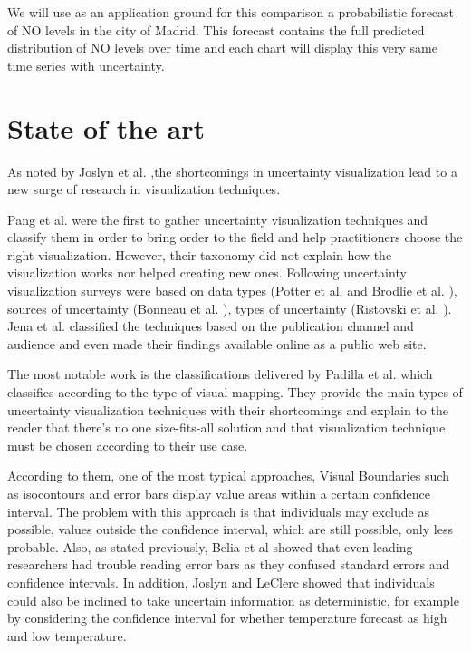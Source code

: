 \documentclass[a4paper,3p,sort&compress]{elsarticle}
\begin{document}
We will use as an application ground for this comparison a probabilistic forecast of NO levels 
in the city of Madrid. This forecast contains the full predicted distribution of NO levels over time
and each chart will display this very same time series with uncertainty. 

\section{State of the art}
\label{sec:results}

As noted by Joslyn et al. \cite{joslyn_communicating_2010},the shortcomings in uncertainty visualization lead to a new surge of 
research in visualization techniques. 

Pang et al. \cite{pang_approaches_1997} were the first to gather uncertainty visualization techniques and classify them in 
order to bring order to the field and help 
practitioners choose the right visualization. However, their taxonomy did not explain how the visualization works nor helped creating new 
ones. Following uncertainty visualization surveys were based on data types (Potter et al. \cite{potter_quantification_2012} and Brodlie et al. 
\cite{brodlie_review_2012}), 
sources of uncertainty (Bonneau et al. \cite{bonneau_overview_2014}), types of uncertainty 
(Ristovski et al. \cite{ristovski_uncertainty_2014}). Jena et al. \cite{jena_uncertainty_2020} classified the techniques 
based on the publication channel and audience and even made their findings available online as a 
public web site. 

The most notable work is the classifications delivered by Padilla et al. \cite{padilla_uncertainty_2021} which classifies according to 
the type of visual mapping. They provide the main types of uncertainty visualization techniques with their shortcomings and 
explain to the reader that there's no one size-fits-all solution and that visualization technique must be chosen according to their use case.

According to them, one of the most typical approaches, Visual Boundaries such as isocontours and error 
bars display value areas within a certain confidence interval. The problem with this approach is 
that individuals may exclude as possible, values outside the confidence interval, which are still 
possible, only less probable. Also, as stated previously, Belia et al \cite{belia_researchers_2005} showed that even leading researchers had 
trouble reading error bars as they confused 
standard errors and confidence intervals. In addition, Joslyn and LeClerc showed that individuals could also be inclined to take uncertain 
information as deterministic, for example by considering the confidence interval for whether temperature 
forecast as high and low temperature. 
\end{document}

